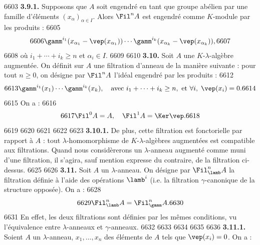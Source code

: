   6603		\noindent\textbf{3.9.1.} Supposons que $A$ soit engendr\'e en tant que groupe ab\'elien par une famille d'\'el\'ements $(x_\alpha)_{\alpha \in I}$. Alors $\Fil^n A$ est engendr\'e comme $K$-module par les produits :
  6605	\begin{equation}
  6606	\gamm^{i_1}(x_{\alpha_1} - \vep(x_{\alpha_1})) \cdots \gamm^{i_k}(x_{\alpha_k} - \vep(x_{\alpha_k})),
  6607	\end{equation}
  6608	o\`u $i_1 + \cdots + i_k \geq n$ et $\alpha_i \in I$.
  6609	
  6610		\noindent\textbf{3.10.} Soit $A$ une $K$-$\lambda$-alg\`ebre augment\'ee. On d\'efinit sur $A$ une filtration d'anneau de la mani\`ere suivante : pour tout $n \geq 0$, on d\'esigne par $\Fil^n A$ l'id\'eal engendr\'e par les produits :
  6612	\begin{equation}
  6613	\gamm^{i_1}(x_1) \cdots \gamm^{i_k}(x_k), \quad \text{avec } i_1 + \cdots + i_k \geq n, \text{ et } \forall i, \; \vep(x_i) = 0.
  6614	\end{equation}
  6615	On a :
  6616	\begin{equation}
  6617	\Fil^0 A = A, \quad \Fil^1 A = \Ker \vep.
  6618	\end{equation}
  6619	
  6620	%
  6621	%
  6622	%
  6623		\noindent\textbf{3.10.1.} De plus, cette filtration est fonctorielle par rapport \`a $A$ : tout $\lambda$-homomorphisme de $K$-$\lambda$-alg\`ebres augment\'ees est compatible aux filtrations. Quand nous consid\`ererons un $\lambda$-anneau augment\'e comme muni d'une filtration, il s'agira, sauf mention expresse du contraire, de la filtration ci-dessus.
  6625	
  6626		\noindent\textbf{3.11.} Soit $A$ un $\lambda$-anneau. On d\'esigne par $\Fil_\lamb^n A$ la filtration d\'efinie \`a l'aide des op\'erations $\lamb^i$ (i.e. la filtration $\gamma$-canonique de la structure oppos\'ee). On a :
  6628	\begin{equation}
  6629	\Fil_\lamb^n A = \Fil_\gamm^n A.
  6630	\end{equation}
  6631	En effet, les deux filtrations sont d\'efinies par les m\^emes conditions, vu l'\'equivalence entre $\lambda$-anneaux et $\gamma$-anneaux.
  6632	
  6633	%
  6634	%
  6635	%
  6636		\noindent\textbf{3.11.1.} Soient $A$ un $\lambda$-anneau, $x_1, \ldots, x_n$ des \'el\'ements de $A$ tels que $\vep(x_i) = 0$. On a :

